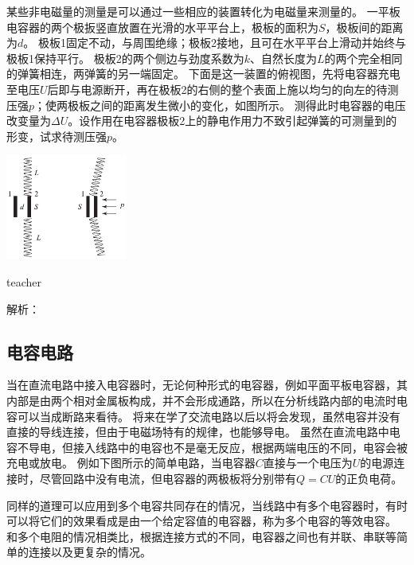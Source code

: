 \begin{example}
某些非电磁量的测量是可以通过一些相应的装置转化为电磁量来测量的。
一平板电容器的两个极扳竖直放置在光滑的水平平台上，极板的面积为$S$，极板间的距离为$d$。
极板1固定不动，与周围绝缘；极板2接地，且可在水平平台上滑动并始终与极板1保持平行。
极板2的两个侧边与劲度系数为$k$、自然长度为$L$的两个完全相同的弹簧相连，两弹簧的另一端固定。
下面是这一装置的俯视图，先将电容器充电至电压$U$后即与电源断开，再在极板2的右侧的整个表面上施以均匀的向左的待测压强$p$；使两极板之间的距离发生微小的变化，如图所示。
测得此时电容器的电压改变量为$\Delta U$。设作用在电容器极板2上的静电作用力不致引起弹簧的可测量到的形变，试求待测压强$p$。
\begin{flushright}
\includegraphics[width = 0.3\textwidth]{images/elec-problem-19.pdf} 
\end{flushright}

\begin{taggedblock}{teacher}

解析：
\end{taggedblock}
\end{example}


\subsection{电容电路}
当在直流电路中接入电容器时，无论何种形式的电容器，例如平面平板电容器，其内部是由两个相对金属板构成，并不会形成通路，所以在分析线路内部的电流时电容可以当成断路来看待。
将来在学了交流电路以后以将会发现，虽然电容并没有直接的导线连接，但由于电磁场特有的规律，也能够导电。
虽然在直流电路中电容不导电，但接入线路中的电容也不是毫无反应，根据两端电压的不同，电容会被充电或放电。
例如下图所示的简单电路，当电容器$C$直接与一个电压为$U$的电源连接时，尽管回路中没有电流，但电容器的两极板将分别带有$Q=CU$的正负电荷。

同样的道理可以应用到多个电容共同存在的情况，当线路中有多个电容器时，有时可以将它们的效果看成是由一个给定容值的电容器，称为多个电容的等效电容。
和多个电阻的情况相类比，根据连接方式的不同，电容器之间也有并联、串联等简单的连接以及更复杂的情况。

